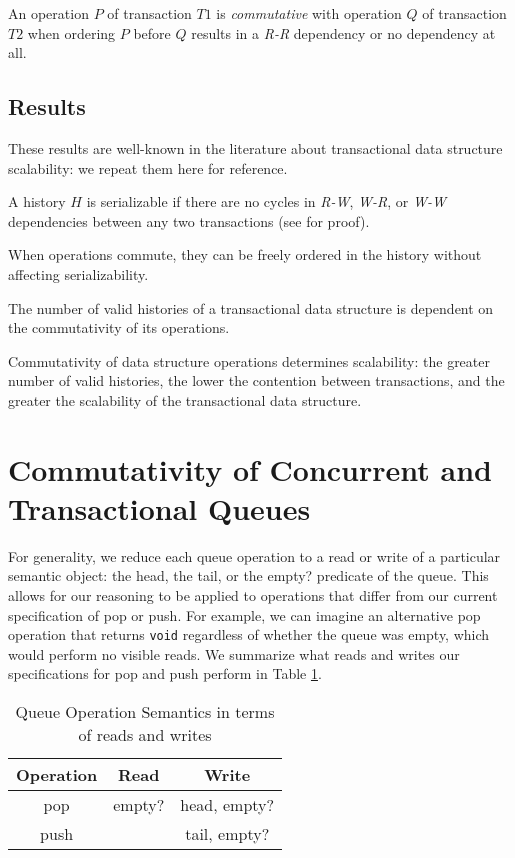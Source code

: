 \begin{defn}
    An operation $P$ of transaction $T1$ is \emph{commutative} with operation $Q$ of transaction $T2$ when ordering $P$ before $Q$ results in a \emph{R-R} dependency or no dependency at all.
\end{defn}

\subsection{Results}

These results are well-known in the literature about transactional data structure scalability: we repeat them here for reference.
\begin{theorem}
    A history $H$ is serializable if there are no cycles in \emph{R-W}, \emph{W-R}, or \emph{W-W} dependencies between any two transactions (see \cite{schwarz} for proof).
\end{theorem}

\begin{corollary}
    When operations commute, they can be freely ordered in the history without affecting serializability.
\end{corollary}
\begin{corollary}
    The number of valid histories of a transactional data structure is dependent on the commutativity of its operations.
\end{corollary}
\begin{corollary}
    Commutativity of data structure operations determines scalability: the greater number of valid histories, the lower the contention between transactions, and the greater the scalability of the transactional data structure. 
\end{corollary}


\section{Commutativity of Concurrent and Transactional Queues}

For generality, we reduce each queue operation to a read or write of a particular semantic object: the head, the tail, or the empty? predicate of the queue. This allows for our reasoning to be applied to operations that differ from our current specification of pop or push. For example, we can imagine an alternative pop operation that returns \texttt{void} regardless of whether the queue was empty, which would perform no visible reads. We summarize what reads and writes our specifications for pop and push perform in Table \ref{table:qrw}.
\begin{table}[h!]
\centering
\begin{tabular}{c||c|c}
    Operation & Read & Write\\
    \hline
    pop & empty? & head, empty?\\
    push & & tail, empty?\\
\end{tabular}
    \caption{Queue Operation Semantics in terms of reads and writes}
    \label{table:qrw}
\end{table}

